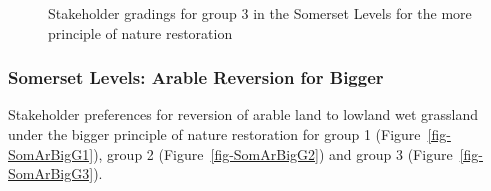 \documentclass[
  12pt,
  letterpaper,
  DIV=11,
  numbers=noendperiod]{scrartcl}
\begin{document}
\begin{figure}[H]


\caption{\label{fig-SomMoreG3}Stakeholder gradings for group 3 in the
Somerset Levels for the more principle of nature restoration}

\end{figure}%

\newpage{}

\subsubsection{Somerset Levels: Arable Reversion for
Bigger}\label{somerset-levels-arable-reversion-for-bigger}

Stakeholder preferences for reversion of arable land to lowland wet
grassland under the bigger principle of nature restoration for group 1
(Figure~\ref{fig-SomArBigG1}), group 2 (Figure~\ref{fig-SomArBigG2}) and
group 3 (Figure~\ref{fig-SomArBigG3}).
\end{document}
